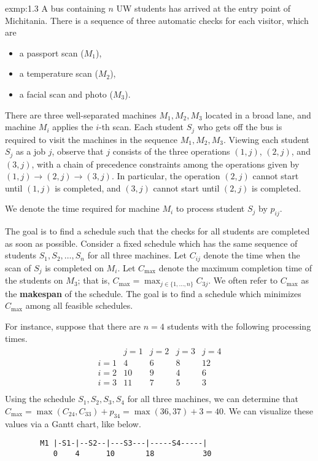 \begin{exmp}{exmp:1.3}
    A bus containing $n$ UW students has arrived at the entry point of 
    Michitania. There is a sequence of three automatic checks for each 
    visitor, which are 
    \begin{itemize}
        \item a passport scan ($M_1$),
        \item a temperature scan ($M_2$), 
        \item a facial scan and photo ($M_3$).
    \end{itemize}
    There are three well-separated machines $M_1, M_2, M_3$ located in a 
    broad lane, and machine $M_i$ applies the $i$-th scan. Each student 
    $S_j$ who gets off the bus is required to visit the machines in the 
    sequence $M_1, M_2, M_3$. Viewing each student $S_j$ as a job $j$, 
    observe that $j$ consists of the three operations $(1, j)$, $(2, j)$, 
    and $(3, j)$, with a chain of precedence constraints among the 
    operations given by $(1, j) \to (2, j) \to (3, j)$. In particular, 
    the operation $(2, j)$ cannot start until $(1, j)$ is completed, 
    and $(3, j)$ cannot start until $(2, j)$ is completed. 

    We denote the time required for machine $M_i$ to process student 
    $S_j$ by $p_{ij}$. 

    The goal is to find a schedule such that the checks for all students 
    are completed as soon as possible. Consider a fixed schedule which 
    has the same sequence of students $S_1, S_2, \dots, S_n$ for all 
    three machines. Let $C_{ij}$ denote the time when the scan of $S_j$ 
    is completed on $M_i$. Let $C_{\max}$ denote the maximum completion 
    time of the students on $M_3$; that is, $C_{\max} = 
    \max_{j \in \{1, \dots, n\}} C_{3j}$. We often refer to 
    $C_{\max}$ as the {\bf makespan} of the schedule. The goal is to 
    find a schedule which minimizes $C_{\max}$ among all feasible schedules.
    
    For instance, suppose that there are $n = 4$ students with the 
    following processing times. 
    \begin{align*}
        \begin{array}{c|cccc}
            & j=1 & j=2 & j=3 & j=4 \\ \hline
        i=1 & 4   & 6   & 8   & 12  \\
        i=2 & 10  & 9   & 4   & 6   \\
        i=3 & 11  & 7   & 5   & 3   \\
        \end{array}
    \end{align*}
    Using the schedule $S_1, S_2, S_3, S_4$ for all three machines, we 
    can determine that $C_{\max} = \max(C_{24}, C_{33}) + p_{34} = 
    \max(36, 37) + 3 = 40$. We can visualize these values via a Gantt chart, 
    like below. 
    \begin{verbatim}
        M1 |-S1-|--S2--|---S3---|-----S4-----| 
           0    4      10       18           30 


\end{verbatim}
\end{exmp}
